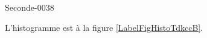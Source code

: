 
\begin{corrige}{Seconde-0038}

L'histogramme est à la figure \ref{LabelFigHistoTdkccB}.
\newcommand{\CaptionFigHistoTdkccB}{L'histogramme de l'exercice \ref{exoSeconde-0038}.}


\end{corrige}
